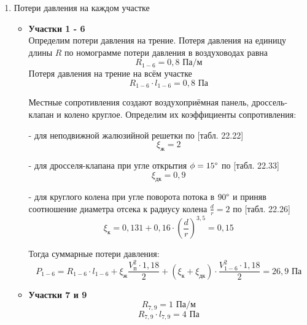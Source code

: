 \begin{enumerate}
    \item   Потери давления на каждом участке
        \begin{itemize}
            \item   \textbf{Участки 1 - 6} \\
                    Определим потери давления на трение. Потеря давления на
                    единицу длины $R$ по номограмме потери давления в воздуховодах равна
                    $$
                        R_{1-6} = 0,8 \text{ Па/м}
                    $$
                    Потеря давления на трение на всём участке
                    $$
                        R_{1-6} \cdot l_{1-6} = 0,8 \text{ Па}
                    $$

                    Местные сопротивления создают воздухоприёмная панель,
                    дроссель-клапан и колено круглое. Определим их коэффициенты
                    сопротивления:

                    - для неподвижной жалюзийной решетки по
                    \cite{air_ventilation_and_conditioning}[табл. 22.22]
                    $$
                        \xi_\text{ж} = 2
                    $$

                    - для дросселя-клапана при угле открытия $\phi = 15 \degree$ по
                    \cite{air_ventilation_and_conditioning}[табл. 22.33]
                    $$
                        \xi_\text{дк} = 0,9
                    $$

                    - для круглого колена при угле поворота потока в $90 \degree$
                    и приняв соотношение диаметра отсека к радиусу колена $\frac{d}{r} = 2$
                    по \cite{air_ventilation_and_conditioning}[табл. 22.26]
                    $$
                        \xi_\text{к} = 0,131 + 0,16 \cdot \left( \frac{d}{r} \right)^{3,5} = 0,15
                    $$

                    Тогда суммарные потери давления:
                    $$
                        P_{1-6} = R_{1-6} \cdot l_{1-6} + \xi_\text{ж} \frac{V_\text{п}^2 \cdot 1,18}{2}
                                    + (\xi_\text{к} + \xi_\text{дк}) \cdot \frac{V_{1-6}^2 \cdot 1,18}{2}
                                = 26,9 \text{ Па}
                    $$

            \item   \textbf{Участки 7 и 9}
                    $$
                        R_{7,9} = 1 \text{ Па/м}
                    $$
                    $$
                        R_{7,9} \cdot l_{7,9} = 4 \text{ Па}
                    $$


\end{itemize}
\end{enumerate}
